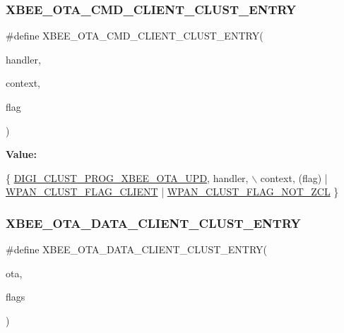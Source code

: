 \subsubsection{\texorpdfstring{X\+B\+E\+E\+\_\+\+O\+T\+A\+\_\+\+C\+M\+D\+\_\+\+C\+L\+I\+E\+N\+T\+\_\+\+C\+L\+U\+S\+T\+\_\+\+E\+N\+T\+RY}{XBEE\_OTA\_CMD\_CLIENT\_CLUST\_ENTRY}}
{\footnotesize\ttfamily \#define X\+B\+E\+E\+\_\+\+O\+T\+A\+\_\+\+C\+M\+D\+\_\+\+C\+L\+I\+E\+N\+T\+\_\+\+C\+L\+U\+S\+T\+\_\+\+E\+N\+T\+RY(\begin{DoxyParamCaption}\item[{}]{handler,  }\item[{}]{context,  }\item[{}]{flag }\end{DoxyParamCaption})}

{\bfseries Value\+:}
\begin{DoxyCode}
\{  \hyperlink{group__wpan__aps_gga1227ab13b41d82d9c9c9080662f74cf7aedb825ada66b8c7bbfbeaee6d9dfba0a}{DIGI\_CLUST\_PROG\_XBEE\_OTA\_UPD}, handler,                           \(\backslash\)
      context, (flag) | \hyperlink{group__wpan__aps_ga9aae0646b212af63cbb07c98a33cd986}{WPAN\_CLUST\_FLAG\_CLIENT} | 
      \hyperlink{group__wpan__aps_gacb0e365a8c5e72ee90be503513e7e630}{WPAN\_CLUST\_FLAG\_NOT\_ZCL} \}
\end{DoxyCode}
\mbox{\label{group__xbee__ota__client_ga35fda0f9b1d07269c75d0407f3b26425}} 
\subsubsection{\texorpdfstring{X\+B\+E\+E\+\_\+\+O\+T\+A\+\_\+\+D\+A\+T\+A\+\_\+\+C\+L\+I\+E\+N\+T\+\_\+\+C\+L\+U\+S\+T\+\_\+\+E\+N\+T\+RY}{XBEE\_OTA\_DATA\_CLIENT\_CLUST\_ENTRY}}
{\footnotesize\ttfamily \#define X\+B\+E\+E\+\_\+\+O\+T\+A\+\_\+\+D\+A\+T\+A\+\_\+\+C\+L\+I\+E\+N\+T\+\_\+\+C\+L\+U\+S\+T\+\_\+\+E\+N\+T\+RY(\begin{DoxyParamCaption}\item[{}]{ota,  }\item[{}]{flags }\end{DoxyParamCaption})}


